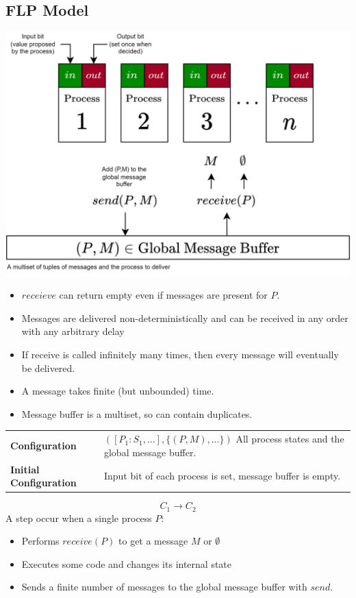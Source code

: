 \subsection{FLP Model}
\begin{center}
    \includegraphics[width=.8\textwidth]{consensus/images/flp_model.drawio.png}
\end{center}
\begin{itemize}
    \item $receieve$ can return empty even if messages are present for $P$.
    \item Messages are delivered non-deterministically and can be received in any order with any arbitrary delay
    \item If receive is called infinitely many times, then every message will eventually be delivered. 
    \item A message takes finite (but unbounded) time.
    \item Message buffer is a multiset, so can contain duplicates.
\end{itemize}
\begin{center}
    \begin{tabular}{l p{}}
        \textbf{Configuration} & $([P_1 : S_1, \dots], \{(P, M), \dots\})$ All process states and the global message buffer. \\
        \textbf{Initial Configuration} & Input bit of each process is set, message buffer is empty. \\
    \end{tabular}
\end{center}
\[C_1 \to C_2\]
A step occur when a single process $P$:
\begin{itemize}
    \item Performs $receive(P)$ to get a message $M$ or $\emptyset$
    \item Executes some code and changes its internal state
    \item Sends a finite number of messages to the global message buffer with $send$.
\end{itemize}
